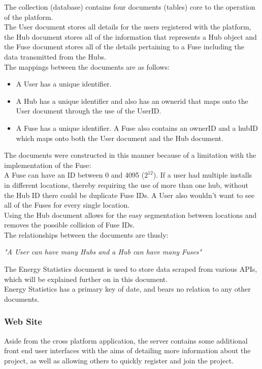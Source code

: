 \documentclass[draft,preprint,12pt,3p]{elsarticle}
\begin{document}
The collection (database) contains four documents (tables) core to the operation of the platform.\\
The User document stores all details for the users registered with the platform, the Hub document stores all of the information that represents a Hub object and the Fuse document stores all of the details pertaining to a Fuse including the data transmitted from the Hubs.\\
The mappings between the documents are as follows:
\begin{itemize}
\item A User has a unique identifier.
\item A Hub has a unique identifier and also has an ownerid that maps onto the User document through the use of the UserID.
\item A Fuse has a unique identifier. A Fuse also contains an ownerID and a hubID which maps onto both the User document and the Hub document.
\end{itemize}
The documents were constructed in this manner because of a limitation with the implementation of the Fuse:\\
A Fuse can have an ID between 0 and 4095 ($2^{12}$). If a user had multiple installs in different locations, thereby requiring the use of more than one hub, without the Hub ID there could be duplicate Fuse IDs. A User also wouldn't want to see all of the Fuses for every single location.\\ 
Using the Hub document allows for the easy segmentation between locations and removes the possible collision of Fuse IDs.\\

The relationships between the documents are thusly:
\begin{center}
    \textit{"A User can have many Hubs and a Hub can have many Fuses"}
\end{center}
The Energy Statistics document is used to store data scraped from various APIs, which will be explained further on in this document.\\
Energy Statistics has a primary key of date, and bears no relation to any other documents. 

\subsubsection{Web Site}
Aside from the cross platform application, the server contains some additional front end user interfaces with the aims of detailing more information about the project, as well as allowing others to quickly register and join the project.\\
\end{document}
